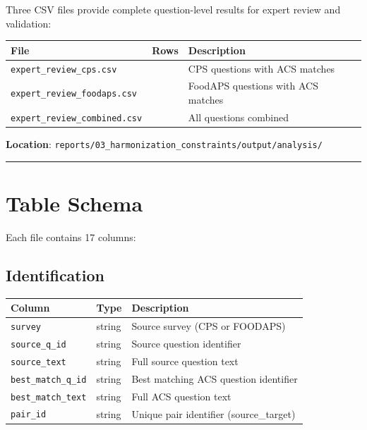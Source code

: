 \documentclass[
  letterpaper,
]{report}
\begin{document}
Three CSV files provide complete question-level results for expert
review and validation:

\begin{longtable}[]{@{}
  >{\raggedright\arraybackslash}p{}
  >{\raggedright\arraybackslash}p{}
  >{\raggedright\arraybackslash}p{}@{}}
\toprule\noalign{}
\begin{minipage}[b]{\linewidth}\raggedright
File
\end{minipage} & \begin{minipage}[b]{\linewidth}\raggedright
Rows
\end{minipage} & \begin{minipage}[b]{\linewidth}\raggedright
Description
\end{minipage} \\
\midrule\noalign{}
\endhead
\bottomrule\noalign{}
\endlastfoot
\texttt{expert\_review\_cps.csv} & 240 & CPS questions with ACS
matches \\
\texttt{expert\_review\_foodaps.csv} & 140 & FoodAPS questions with ACS
matches \\
\texttt{expert\_review\_combined.csv} & 380 & All questions combined \\
\end{longtable}

\textbf{Location}:
\texttt{reports/03\_harmonization\_constraints/output/analysis/}

\begin{center}\rule{0.5\linewidth}{0.5pt}\end{center}

\section{Table Schema}\label{table-schema}

Each file contains 17 columns:

\subsection{Identification}\label{identification}

\begin{longtable}[]{@{}lll@{}}
\toprule\noalign{}
Column & Type & Description \\
\midrule\noalign{}
\endhead
\bottomrule\noalign{}
\endlastfoot
\texttt{survey} & string & Source survey (CPS or FOODAPS) \\
\texttt{source\_q\_id} & string & Source question identifier \\
\texttt{source\_text} & string & Full source question text \\
\texttt{best\_match\_q\_id} & string & Best matching ACS question
identifier \\
\texttt{best\_match\_text} & string & Full ACS question text \\
\texttt{pair\_id} & string & Unique pair identifier (source\_target) \\
\end{longtable}
\end{document}
